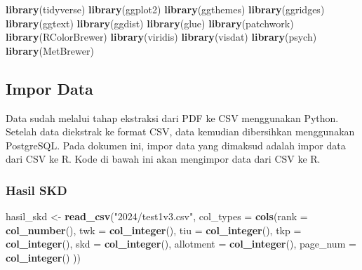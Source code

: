 \documentclass[
]{article}
\newenvironment{Shaded}{\begin{snugshade}}{\end{snugshade}}
\newcommand{\AttributeTok}[1]{\textcolor[rgb]{0.13,0.29,0.53}{#1}}
\newcommand{\FunctionTok}[1]{\textcolor[rgb]{0.13,0.29,0.53}{\textbf{#1}}}
\newcommand{\NormalTok}[1]{#1}
\newcommand{\OtherTok}[1]{\textcolor[rgb]{0.56,0.35,0.01}{#1}}
\newcommand{\StringTok}[1]{\textcolor[rgb]{0.31,0.60,0.02}{#1}}
\begin{document}
\begin{Shaded}
\begin{Highlighting}[]
\FunctionTok{library}\NormalTok{(tidyverse)}
\FunctionTok{library}\NormalTok{(ggplot2)}
\FunctionTok{library}\NormalTok{(ggthemes)}
\FunctionTok{library}\NormalTok{(ggridges)}
\FunctionTok{library}\NormalTok{(ggtext)}
\FunctionTok{library}\NormalTok{(ggdist)}
\FunctionTok{library}\NormalTok{(glue)}
\FunctionTok{library}\NormalTok{(patchwork)}
\FunctionTok{library}\NormalTok{(RColorBrewer)}
\FunctionTok{library}\NormalTok{(viridis)}
\FunctionTok{library}\NormalTok{(visdat)}
\FunctionTok{library}\NormalTok{(psych)}
\FunctionTok{library}\NormalTok{(MetBrewer)}
\end{Highlighting}
\end{Shaded}

\subsection{Impor Data}\label{impor-data}

Data sudah melalui tahap ekstraksi dari PDF ke CSV menggunakan Python.
Setelah data diekstrak ke format CSV, data kemudian dibersihkan
menggunakan PostgreSQL. Pada dokumen ini, impor data yang dimaksud
adalah impor data dari CSV ke R. Kode di bawah ini akan mengimpor data
dari CSV ke R.

\subsubsection{Hasil SKD}\label{hasil-skd}

\begin{Shaded}
\begin{Highlighting}[]
\NormalTok{hasil\_skd }\OtherTok{\textless{}{-}} \FunctionTok{read\_csv}\NormalTok{(}\StringTok{"2024/test1v3.csv"}\NormalTok{,}
                      \AttributeTok{col\_types =} \FunctionTok{cols}\NormalTok{(}\AttributeTok{rank =} \FunctionTok{col\_number}\NormalTok{(),}
                                       \AttributeTok{twk =} \FunctionTok{col\_integer}\NormalTok{(),}
                                       \AttributeTok{tiu =} \FunctionTok{col\_integer}\NormalTok{(),}
                                       \AttributeTok{tkp =} \FunctionTok{col\_integer}\NormalTok{(),}
                                       \AttributeTok{skd =} \FunctionTok{col\_integer}\NormalTok{(),}
                                       \AttributeTok{allotment =} \FunctionTok{col\_integer}\NormalTok{(),}
                                       \AttributeTok{page\_num =} \FunctionTok{col\_integer}\NormalTok{()}
\NormalTok{                      ))}
\end{Highlighting}
\end{Shaded}
\end{document}

